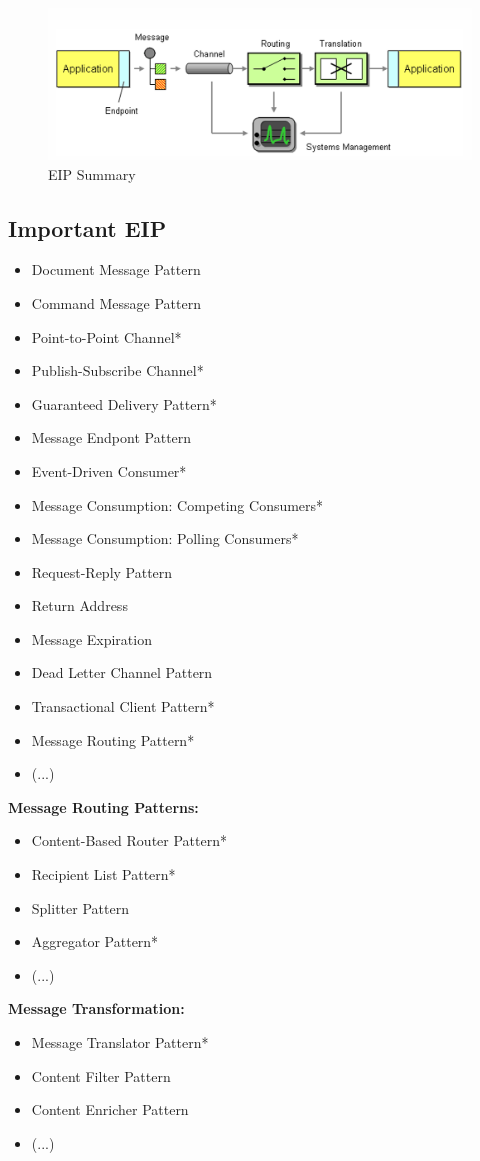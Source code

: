\documentclass[../Main.tex]{subfiles}
\begin{document}
\begin{figure}[H]
    \centering
    \includegraphics[width=0.75\linewidth]{Images/eip-overview.png}
    \caption{EIP Summary}
\end{figure}

\newpage
\subsection{Important EIP}
\begin{multicols}{2}
    \begin{itemize}
        \item Document Message Pattern
        \item Command Message Pattern
        \item Point-to-Point Channel*
        \item Publish-Subscribe Channel*
        \item Guaranteed Delivery Pattern*
        \item Message Endpont Pattern
        \item Event-Driven Consumer*
        \item Message Consumption: Competing Consumers*
        \item Message Consumption: Polling Consumers*
        \item Request-Reply Pattern
        \item Return Address
        \item Message Expiration
        \item Dead Letter Channel Pattern
        \item Transactional Client Pattern*
        \item Message Routing Pattern*
        \item (...)
    \end{itemize}
    \textbf{Message Routing Patterns:}
    \begin{itemize}
        \item Content-Based Router Pattern*
        \item Recipient List Pattern*
        \item Splitter Pattern
        \item Aggregator Pattern*
        \item (...)
    \end{itemize}
    \textbf{Message Transformation:}
    \begin{itemize}
        \item Message Translator Pattern*
        \item Content Filter Pattern
        \item Content Enricher Pattern
        \item (...)
    \end{itemize}
\end{multicols}
\newpage
\end{document}
